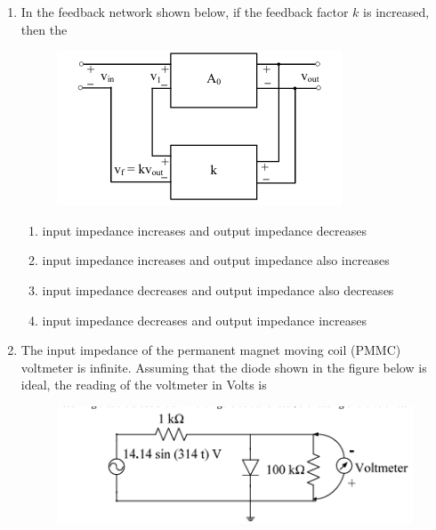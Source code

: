 \documentclass[journal,12pt,onecolumn]{IEEEtran}
\theoremstyle{remark}
\begin{document}
\begin{enumerate}
  \item In the feedback network shown below, if the feedback factor $k$ is increased, then the  
  \begin{figure}[h]
      \centering
      \includegraphics[width=0.5\columnwidth]{figs/4.png}
      \label{fig:placeholder}
  \end{figure}
  \begin{enumerate}
    \item input impedance increases and output impedance decreases  
    \item input impedance increases and output impedance also increases  
    \item input impedance decreases and output impedance also decreases  
    \item input impedance decreases and output impedance increases  
  \end{enumerate}

  \item The input impedance of the permanent magnet moving coil (PMMC) voltmeter is infinite. Assuming that the diode shown in the figure below is ideal, the reading of the voltmeter in Volts is  
\begin{figure}[H]
      \centering
      \includegraphics[width=0.5\columnwidth]{figs/5.png}
      \label{fig:placeholder}
  \end{figure}
    \begin{enumerate}
  \end{enumerate}







\end{enumerate}
\end{document}
